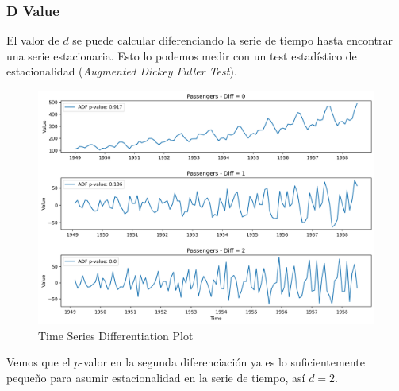 \subsubsection{D Value}

El valor de $d$ se puede calcular diferenciando la serie de tiempo hasta encontrar una serie estacionaria. Esto lo podemos medir con un test estadístico de estacionalidad (\textit{Augmented Dickey Fuller Test}).

\begin{figure}[H]
    \center
    \includegraphics[scale=0.5]{notebooks/ML/img/time_series_differentiation.png}
    \caption{Time Series Differentiation Plot}
\end{figure}

Vemos que el $p$-valor en la segunda diferenciación ya es lo suficientemente pequeño para asumir estacionalidad en la serie de tiempo, así $d=2$. 

